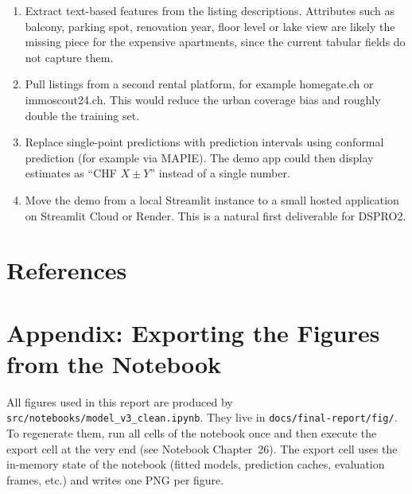 \documentclass[11pt,a4paper]{article}
\begin{document}
\begin{enumerate}
    \item Extract text-based features from the listing descriptions. Attributes such as balcony, parking spot, renovation year, floor level or lake view are likely the missing piece for the expensive apartments, since the current tabular fields do not capture them.
    \item Pull listings from a second rental platform, for example homegate.ch or immoscout24.ch. This would reduce the urban coverage bias and roughly double the training set.
    \item Replace single-point predictions with prediction intervals using conformal prediction (for example via MAPIE). The demo app could then display estimates as ``CHF $X \pm Y$'' instead of a single number.
    \item Move the demo from a local Streamlit instance to a small hosted application on Streamlit Cloud or Render. This is a natural first deliverable for DSPRO2.
\end{enumerate}

\section{References}
\label{sec:references}




\appendix
\newpage

\section{Appendix: Exporting the Figures from the Notebook}
\label{app:export}

All figures used in this report are produced by \texttt{src/notebooks/model\_v3\_clean.ipynb}. They live in \texttt{docs/final-report/fig/}. To regenerate them, run all cells of the notebook once and then execute the export cell at the very end (see Notebook Chapter~26). The export cell uses the in-memory state of the notebook (fitted models, prediction caches, evaluation frames, etc.) and writes one PNG per figure.
\end{document}

